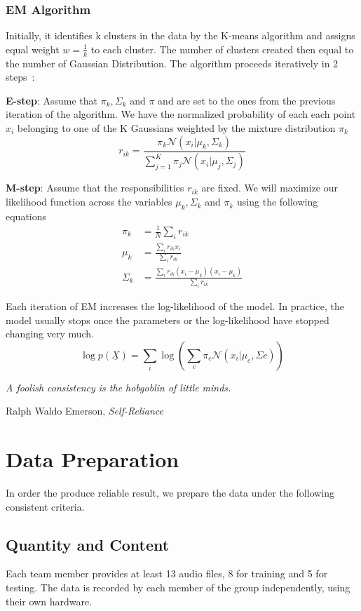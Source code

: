 \documentclass[a4paper,12pt]{article}
\begin{document}
\subsubsection{EM Algorithm}
Initially, it identifies k clusters in the data by the K-means algorithm and
assigns equal weight \(w = \frac{1}{k}\) to each cluster.  The number of
clusters created then equal to the number of Gaussian Distribution.  The
algorithm proceeds iteratively in 2 steps~\cite{emalgorithm}:

\textbf{E-step}: Assume that $\pi_{k}, \Sigma_{k}$ and $\pi$ and are set to
the ones from the previous iteration of the algorithm.  We have the normalized
probability of each each point $x_{i}$ belonging to one of the K Gaussians
weighted by the mixture distribution $\pi_{k}$
\[r_{ik} = \frac{\pi_{k}\mathcal{N}(x_{i}|\mu_{k}, \Sigma_{k})}
                {\sum_{j=1}^{K}\pi_{j}\mathcal{N}(x_{i}|\mu_{j}, \Sigma_{j})}\]

\textbf{M-step}: Assume that the responsibilities $r_{ik}$ are fixed.  We will
maximize our likelihood function across the variables $\mu_{k}, \Sigma_{k}$ and
$ \pi_{k}$ using the following equations
\begin{align*}
  \pi_{k} &= \frac{1}{N}\sum_{i}r_{ik}\\
  \mu_{k} &= \frac{\sum_{i}r_{ik}x_{i}}{\sum_{i}r_{ik}}\\
  \Sigma_{k} &= \frac{\sum_{i}r_{ik}(x_{i}-\mu_{k})(x_{i}-\mu_{k})}{\sum_{i}r_{ik}}
\end{align*}

Each iteration of EM increases the log-likelihood of the model.  In practice,
the model usually stops once the parameters or the log-likelihood have stopped
changing very much.
\[\log p(\underline{X}) = \sum_{i}\log\left(
\sum_{c}\pi_{c}\mathcal{N}(x_{i}|\mu_{c}, \Sigma{c})\right)\]

\newpage
\setlength{}
\epigraph{\textit{A foolish consistency is the hobgoblin of little minds.}}
         {Ralph Waldo Emerson, \textit{Self-Reliance}}
\section{Data Preparation}
In order the produce reliable result, we prepare the data under the following
consistent criteria.

\subsection{Quantity and Content}
Each team member provides at least 13 audio files, 8 for training and
5 for testing.  The data is recorded by each member of the group independently,
using their own hardware.
\end{document}
